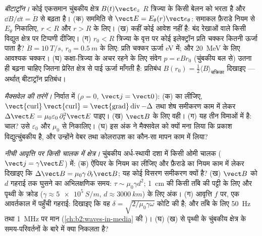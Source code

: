 \begin{exercise}[$\star\star\star$]\label{exo:b2:maxwell-equations:10}
\emph{बीटाट्रॉन।} कोई एकसमान चुंबकीय क्षेत्र $B(t)\vect e_z$ $R$ त्रिज्या के
किसी बेलन को भरता है और $\dd B/\dd t = \dot B$ से बढ़ता है। (क) सममिति से
$\vect E = E_\theta(r)\vect e_\theta$: समाकल फ़ैराडे नियम से $E_\theta$ निकालिए,
$r < R$ और $r > R$ के लिए। (ख) कहीं कोई आवेश नहीं है: बंद रेखाओं वाले किसी
विद्युत क्षेत्र पर टिप्पणी दीजिए। (ग) $r_0 < R$ त्रिज्या के वृत्त पर कोई
इलेक्ट्रॉन प्रति चक्कर कितनी ऊर्जा पाता है? $\dot B = \qty{10}{T/s}$,
$r_0 = \qty{0.5}{m}$ के लिए: प्रति चक्कर ऊर्जा eV में; और \qty{20}{MeV} के लिए आवश्यक चक्कर।
(घ) कक्षा-त्रिज्या के अचर रहने के लिए संवेग $p = eBr_0$ (चुंबकीय बल से)
उतना ही बढ़ना चाहिए जितना प्रेरित क्षेत्र से पाई ऊर्जा
माँगती है: प्रतिबंध $B(r_0) = \tfrac12\langle B\rangle_{\text{चक्रिका}}$ दिखाइए
--- अर्थात् बीटाट्रॉन प्रतिबंध।
\end{exercise}

\begin{exercise}[$\star\star\star$]\label{exo:b2:maxwell-equations:11}
\emph{मैक्सवेल की तरंगें।} निर्वात में ($\rho = 0$, $\vect j = \vect 0$): (क)
 का  लीजिए, $\operatorname{\vect{curl}}
\operatorname{\vect{curl}} = \operatorname{\vect{grad}}\operatorname{div} - \Delta$ तथा शेष
समीकरण काम में लेकर $\Delta\vect E = \mu_0\varepsilon_0\,\partial_t^2\vect E$ पाइए। (ख) $\vect B$ के
लिए वही। (ग) यह तीन विमाओं में  है: चाल?
उसे $\varepsilon_0$ और $\mu_0$ से निकालिए। (घ) इस अंक ने मैक्सवेल को क्यों मना लिया
कि प्रकाश विद्युत्चुंबकीय है, और उन्होंने
वेबर तथा कोलराउश का कौन-सा मापन काम में लिया?
\end{exercise}

\begin{exercise}[$\star\star\star$]\label{exo:b2:maxwell-equations:12}
\emph{नीची आवृत्ति पर किसी चालक में क्षेत्र।} चुंबकीय अर्ध-स्थायी दशा में
किसी ओमी चालक ($\vect j = \gamma\vect E$) में: (क) ऐंपियर के नियम का 
लीजिए और फ़ैराडे का नियम काम में लेकर दिखाइए कि $\Delta\vect B = \mu_0\gamma\,
\partial_t\vect B$; यह कोई विसरण समीकरण क्यों है? (ख) $\vect B$ को $d$ गहराई तक
घुसने का अभिलक्षणिक समय: $\tau \sim \mu_0\gamma d^2$; \qty{1}{cm} की किसी ताँबे की
पट्टी के लिए और पृथ्वी के क्रोड ($\gamma \approx \qty{5e5}{S/m}$,
$d \approx \qty{3000}{km}$) के लिए अंक। (ग) आवृत्ति $f$ पर, एक आवर्तकाल में
पहुँची गहराई: दिखाइए कि वह $\delta = \sqrt{2/\mu_0\gamma\omega}$ कोटि की है; और ताँबे के लिए
\qty{50}{Hz} तथा \qty{1}{MHz} पर मान (\cref{ch:b2:waves-in-media} की
)। (घ) (ख) से पृथ्वी के चुंबकीय क्षेत्र के समय-परिवर्तनों के
बारे में क्या निकलता है?
\end{exercise}

